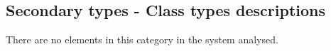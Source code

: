 \subsection{Secondary types - Class types descriptions}



There are no elements in this category in the system analysed.
		
